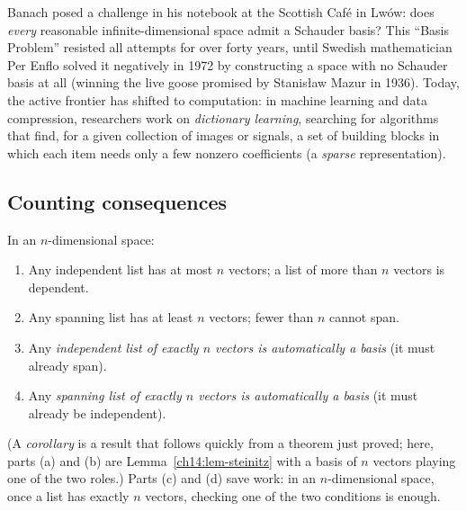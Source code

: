 \begin{historybox}
Banach posed a challenge in his notebook at the Scottish Café in Lwów: does \emph{every} reasonable infinite-dimensional space admit a Schauder basis? This ``Basis Problem'' resisted all attempts for over forty years, until Swedish mathematician Per Enflo solved it negatively in 1972 by constructing a space with no Schauder basis at all (winning the live goose promised by Stanisław Mazur in 1936). Today, the active frontier has shifted to computation: in machine learning and data compression, researchers work on \emph{dictionary learning}, searching for algorithms that find, for a given collection of images or signals, a set of building blocks in which each item needs only a few nonzero coefficients (a \emph{sparse} representation).
\end{historybox}

\subsection*{Counting consequences}

\begin{corollary}
\label{ch14:cor-count}
In an $n$-dimensional space:
\begin{enumerate}[label=(\alph*)]
  \item Any independent list has at most $n$ vectors; a list of more than $n$ vectors is
        dependent.
  \item Any spanning list has at least $n$ vectors; fewer than $n$ cannot span.
  \item Any \emph{independent list of exactly $n$ vectors is automatically a
        basis} (it must already span).
  \item Any \emph{spanning list of exactly $n$ vectors is automatically a basis}
        (it must already be independent).
\end{enumerate}
\end{corollary}

(A \emph{corollary} is a result that follows quickly from a theorem just proved; here,
parts (a) and (b) are Lemma~\ref{ch14:lem-steinitz} with a basis of $n$ vectors
playing one of the two roles.)
Parts (c) and (d) save work: in an $n$-dimensional space, once a
list has exactly $n$ vectors, checking one of the two conditions is enough.

